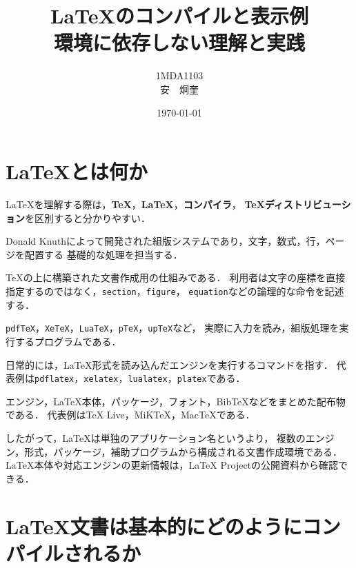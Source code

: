 \documentclass[a4paper,11pt]{jsarticle}
\title{LaTeXのコンパイルと表示例\\
\large 環境に依存しない理解と実践}
\author{1MDA1103\\安　炯奎}
\date{\today}
\newcommand{\code}[1]{\texttt{#1}}
\begin{document}
\maketitle


\tableofcontents
\clearpage

\clearpage
\section{LaTeXとは何か}

LaTeXを理解する際は，\textbf{TeX}，\textbf{LaTeX}，\textbf{コンパイラ}，
\textbf{TeXディストリビューション}を区別すると分かりやすい．

\begin{description}[style=nextline,leftmargin=3.5cm]
  \item[TeX]
  Donald Knuthによって開発された組版システムであり，文字，数式，行，ページを配置する
  基礎的な処理を担当する．

  \item[LaTeX]
  TeXの上に構築された文書作成用の仕組みである．
  利用者は文字の座標を直接指定するのではなく，\code{section}，\code{figure}，
  \code{equation}などの論理的な命令を記述する．

  \item[TeXエンジン]
  \code{pdfTeX}，\code{XeTeX}，\code{LuaTeX}，\code{pTeX}，\code{upTeX}など，
  実際に入力を読み，組版処理を実行するプログラムである．

  \item[LaTeXコンパイラ]
  日常的には，LaTeX形式を読み込んだエンジンを実行するコマンドを指す．
  代表例は\code{pdflatex}，\code{xelatex}，\code{lualatex}，\code{platex}である．

  \item[TeXディストリビューション]
  エンジン，LaTeX本体，パッケージ，フォント，BibTeXなどをまとめた配布物である．
  代表例はTeX Live，MiKTeX，MacTeXである．
\end{description}

したがって，LaTeXは単独のアプリケーション名というより，
複数のエンジン，形式，パッケージ，補助プログラムから構成される文書作成環境である．
LaTeX本体や対応エンジンの更新情報は，LaTeX Projectの公開資料から確認できる\cite{latex-project-engines}．

\section{LaTeX文書は基本的にどのようにコンパイルされるか}
\end{document}
